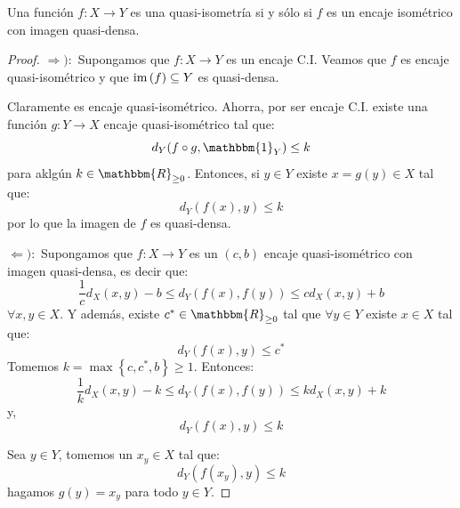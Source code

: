 \documentclass[12pt]{report}
\theoremstyle{largebreak}
\newcommand\cf[3]{\ensuremath{#1:#2\rightarrow#3}}
\newcommand{\bbm}[1]{\ensuremath{\mathbbm{#1}}}
\begin{document}
    \begin{theor}
        Una función $\cf{f}{X}{Y}$ es una quasi-isometría si y sólo si $f$ es un encaje isométrico con imagen quasi-densa.
    \end{theor}

    \newcommand{\im}[1]{\ensuremath{\textup{im}\left(#1\right)}}

    \begin{proof}
        $\Rightarrow):$ Supongamos que $\cf{f}{X}{Y}$ es un encaje C.I. Veamos que $f$ es encaje quasi-isométrico y que $\im{f}\subseteq Y$ es quasi-densa.

        Claramente es encaje quasi-isométrico. Ahorra, por ser encaje C.I. existe una función $\cf{g}{Y}{X}$ encaje quasi-isométrico tal que:
        \begin{equation*}
            d_Y(f\circ g,\bbm{1}_Y)\leq k
        \end{equation*}
        para aklgún $k\in\bbm{R}_{\geq0}$. Entonces, si $y\in Y$ existe $x=g(y)\in X$ tal que:
        \begin{equation*}
            d_Y(f(x),y)\leq k
        \end{equation*}
        por lo que la imagen de $f$ es quasi-densa.

        $\Leftarrow):$ Supongamos que $\cf{f}{X}{Y}$ es un $(c,b)$ encaje quasi-isométrico con imagen quasi-densa, es decir que:
        \begin{equation*}
            \frac{1}{c}d_X(x,y)-b\leq d_Y(f(x),f(y))\leq cd_X(x,y)+b
        \end{equation*}
        $\forall x,y\in X$. Y además, existe $c^*\in\bbm{R}_{\geq0}$ tal que $\forall y\in Y$ existe $x\in X$ tal que:
        \begin{equation*}
            d_Y(f(x),y)\leq c^*
        \end{equation*}
        Tomemos $k=\max\left\{c,c^*,b \right\}\geq 1$. Entonces:
        \begin{equation*}
            \frac{1}{k}d_X(x,y)-k\leq d_Y(f(x),f(y))\leq kd_X(x,y)+k
        \end{equation*}
        y,
        \begin{equation*}
            d_Y(f(x),y)\leq k
        \end{equation*}

        Sea $y\in Y$, tomemos un $x_y\in X$ tal que:
        \begin{equation*}
            d_Y(f(x_y),y)\leq k
        \end{equation*}
        hagamos $g(y)=x_y$ para todo $y\in Y$.
    \end{proof}
\end{document}
